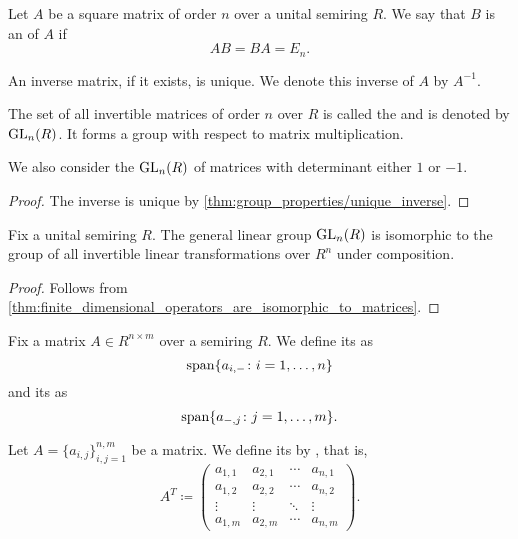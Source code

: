 \begin{definition}\label{def:inverse_matrix}
  Let \( A \) be a square matrix of order \( n \) over a unital semiring \( R \). We say that \( B \) is an  of \( A \) if
  \begin{equation*}
    AB = BA = E_n.
  \end{equation*}

  An inverse matrix, if it exists, is unique. We denote this inverse of \( A \) by \( A^{-1} \).

  The set of all invertible matrices of order \( n \) over \( R \) is called the  and is denoted by \( \operatorname{GL}_n(R) \). It forms a group with respect to matrix multiplication.

  We also consider the  \( \operatorname{GL}_n(R) \) of matrices with determinant either \( 1 \) or \( -1 \).
\end{definition}
\begin{proof}
  The inverse is unique by \cref{thm:group_properties/unique_inverse}.
\end{proof}

\begin{proposition}\label{def:matrix_is_invertible_iff_singular}
  Fix a unital semiring \( R \). The general linear group \( \operatorname{GL}_n(R) \) is isomorphic to the group of all invertible linear transformations over \( R^n \) under composition.
\end{proposition}
\begin{proof}
  Follows from \cref{thm:finite_dimensional_operators_are_isomorphic_to_matrices}.
\end{proof}

\begin{definition}\label{def:matrix_column_and_row_space}
  Fix a matrix \( A \in R^{n \times m} \) over a semiring \( R \). We define its  as
  \begin{equation*}
    \operatorname{span} \{ a_{i,-} \colon i = 1, \ldots, n \}
  \end{equation*}
  and its  as
  \begin{equation*}
    \operatorname{span} \{ a_{-,j} \colon j = 1, \ldots, m \}.
  \end{equation*}
\end{definition}

\begin{definition}\label{def:matrix_transpose}
  Let \( A = \{ a_{i,j} \}_{i,j=1}^{n,m} \) be a matrix. We define its  by , that is,
  \begin{equation*}
    A^T \coloneqq \begin{pmatrix}
      a_{1,1} & a_{2,1} & \cdots & a_{n,1} \\
      a_{1,2} & a_{2,2} & \cdots & a_{n,2} \\
      \vdots  & \vdots  & \ddots & \vdots \\
      a_{1,m} & a_{2,m} & \cdots & a_{n,m}
    \end{pmatrix}.
  \end{equation*}
\end{definition}

